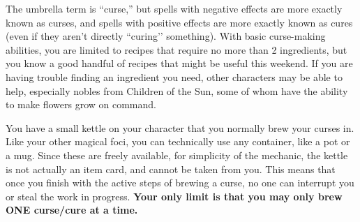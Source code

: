 \documentclass[green]{GL2020}
\begin{document}
\name{\gCursemakingBasic{}}

The umbrella term is ``curse,'' but spells with negative effects are more exactly known as curses, and spells with positive effects are more exactly known as cures (even if they aren’t directly ``curing’’ something). With basic curse-making abilities, you are limited to recipes that require no more than 2 ingredients, but you know a good handful of recipes that might be useful this weekend. If you are having trouble finding an ingredient you need, other characters may be able to help, especially nobles from Children of the Sun, some of whom have the ability to make flowers grow on command.

You have a small kettle on your character that you normally brew your curses in. Like your other magical foci, you can technically use any container, like a pot or a mug. Since these are freely available, for simplicity of the mechanic, the kettle is not actually an item card, and cannot be taken from you. This means that once you finish with the active steps of brewing a curse, no one can interrupt you or steal the work in progress. \textbf{Your only limit is that you may only brew ONE curse/cure at a time.}
\end{document}
